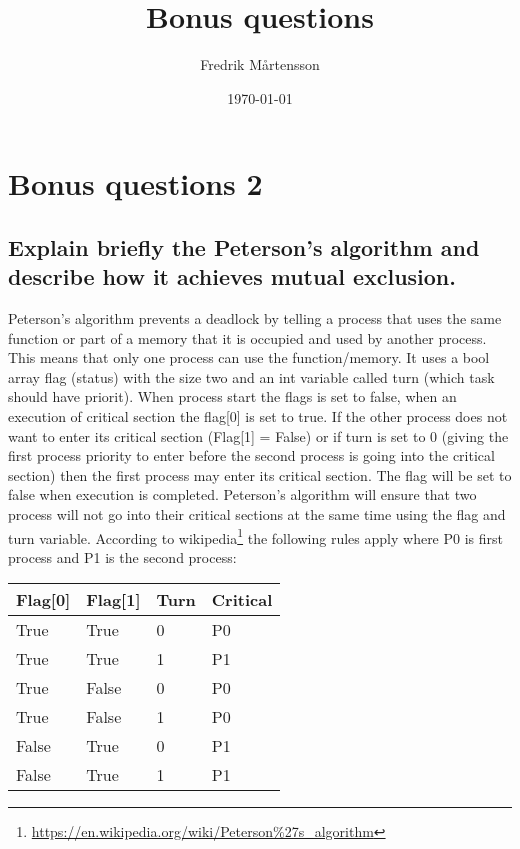 \documentclass[../../../main.tex]{subfiles}
\title{Bonus questions}
\author{Fredrik Mårtensson}
\date{\today}
\begin{document}
\maketitle

\section{Bonus questions 2}
\subsection{Explain briefly the Peterson’s algorithm and describe how it achieves mutual exclusion.}
Peterson's algorithm prevents a deadlock by telling a process that uses the same function or part of a memory that it is occupied and used by another process. This means that only one process can use the function/memory. It uses a bool array flag (status) with the size two and an int variable called turn (which task should have priorit). When process start the flags is set to false, when an execution of critical section the flag[0] is set to true. If the other process does not want to enter its critical section (Flag[1] = False) or if turn is set to 0 (giving the first process priority to enter before the second process is going into the critical section) then the first process may enter its critical section. The flag will be set to false when execution is completed. Peterson's algorithm will ensure that two process will not go into their critical sections at the same time using the flag and turn variable. According to wikipedia\footnote{\url{https://en.wikipedia.org/wiki/Peterson\%27s_algorithm}} the following rules apply where P0 is first process and P1 is the second process:

\begin{table}[H]
\begin{tabular}{|l|l|l|l|}
\hline
Flag{[}0{]} & Flag{[}1{]} & Turn & Critical \\ \hline
True & True & 0 & P0 \\ \hline
True & True & 1 & P1 \\ \hline
True & False & 0 & P0 \\ \hline
True & False & 1 & P0 \\ \hline
False & True & 0 & P1 \\ \hline
False & True & 1 & P1 \\ \hline
\end{tabular}
\end{table}
\end{document}
